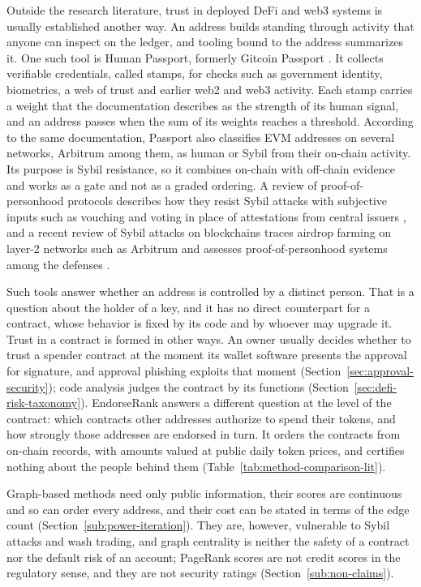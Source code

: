 Outside the research literature, trust in deployed DeFi and web3 systems is usually established another way. An address builds standing through activity that anyone can inspect on the ledger, and tooling bound to the address summarizes it. One such tool is Human Passport, formerly Gitcoin Passport \parencite{humanpassportnddocs}. It collects verifiable credentials, called stamps, for checks such as government identity, biometrics, a web of trust and earlier web2 and web3 activity. Each stamp carries a weight that the documentation describes as the strength of its human signal, and an address passes when the sum of its weights reaches a threshold. According to the same documentation, Passport also classifies EVM addresses on several networks, Arbitrum among them, as human or Sybil from their on-chain activity. Its purpose is Sybil resistance, so it combines on-chain with off-chain evidence and works as a gate and not as a graded ordering. A review of proof-of-personhood protocols describes how they resist Sybil attacks with subjective inputs such as vouching and voting in place of attestations from central issuers \parencite{siddarth2020watchmen}, and a recent review of Sybil attacks on blockchains traces airdrop farming on layer-2 networks such as Arbitrum and assesses proof-of-personhood systems among the defenses \parencite{bordeianu2026sybil}.

Such tools answer whether an address is controlled by a distinct person. That is a question about the holder of a key, and it has no direct counterpart for a contract, whose behavior is fixed by its code and by whoever may upgrade it. Trust in a contract is formed in other ways. An owner usually decides whether to trust a spender contract at the moment its wallet software presents the approval for signature, and approval phishing exploits that moment (Section~\ref{sec:approval-security}); code analysis judges the contract by its functions (Section~\ref{sec:defi-risk-taxonomy}). EndorseRank answers a different question at the level of the contract: which contracts other addresses authorize to spend their tokens, and how strongly those addresses are endorsed in turn. It orders the contracts from on-chain records, with amounts valued at public daily token prices, and certifies nothing about the people behind them (Table~\ref{tab:method-comparison-lit}).

Graph-based methods need only public information, their scores are continuous and so can order every address, and their cost can be stated in terms of the edge count (Section~\ref{sub:power-iteration}). They are, however, vulnerable to Sybil attacks \parencite{douceur2002sybil} and wash trading, and graph centrality is neither the safety of a contract nor the default risk of an account; PageRank scores are not credit scores in the regulatory sense, and they are not security ratings (Section~\ref{sub:non-claims}).

